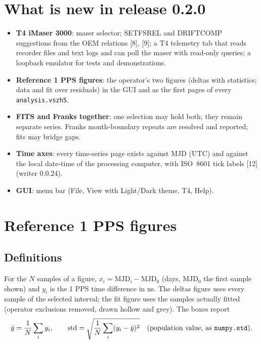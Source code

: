 \documentclass[11pt,a4paper]{article}
\newcommand{\tfourman}{[8]}
\newcommand{\tfournet}{[9]}
\begin{document}
\section{What is new in release 0.2.0}
\begin{itemize}
\item \textbf{T4 iMaser 3000}: maser selector; SETFSREL and DRIFTCOMP suggestions from the
OEM relations \tfourman, \tfournet; a T4 telemetry tab that reads recorder files and text logs
and can poll the maser with read-only queries; a loopback emulator for tests and demonstrations.
\item \textbf{Reference 1 PPS figures}: the operator's two figures (deltas with statistics;
data and fit over residuals) in the GUI and as the first pages of every \texttt{analysis.vszh5}.
\item \textbf{FITS and Franks together}: one selection may hold both; they remain separate
series. Franks month-boundary repeats are resolved and reported; fits may bridge gaps.
\item \textbf{Time axes}: every time-series page exists against MJD (UTC) and against the
local date-time of the processing computer, with ISO~8601 tick labels [12]
(writer 0.0.24).
\item \textbf{GUI}: menu bar (File, View with Light/Dark theme, T4, Help).
\end{itemize}

\section{Reference 1 PPS figures}
\subsection{Definitions}
For the $N$ samples of a figure, $x_i=\mathrm{MJD}_i-\mathrm{MJD}_0$ (days, $\mathrm{MJD}_0$
the first sample shown) and $y_i$ is the 1 PPS time difference in ns. The deltas figure
uses every sample of the selected interval; the fit figure uses the samples actually
fitted (operator exclusions removed, drawn hollow and grey). The boxes report
\[
\bar y=\frac1N\sum_i y_i,\qquad
\mathrm{std}=\sqrt{\frac1N\sum_i (y_i-\bar y)^2}\quad(\text{population value, as \texttt{numpy.std}}).
\]
\end{document}
